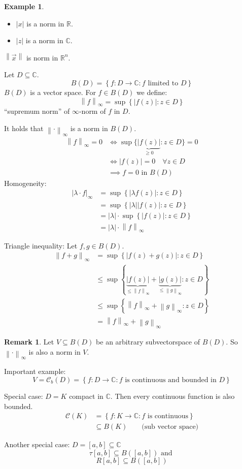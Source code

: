 \documentclass[a4paper,landscape,twocolumn]{article}
\theoremstyle{definition}
\newtheorem{rem}{Remark}
\newtheorem{ex}{Example}
\newcommand\set[1]{\left\{#1\right\}}
\newcommand\abs[1]{\left|#1\right|}
\newcommand\norm[1]{\left\|#1\right\|}
\newcommand\inorm[1]{\left\|#1\right\|_\infty}
\begin{document}
\begin{ex}
  \begin{itemize}
    \item $\abs{x}$ is a norm in $\mathbb R$.
    \item $\abs{z}$ is a norm in $\mathbb C$.
  \end{itemize}
  $\norm{\vec{x}}$ is norm in $\mathbb R^n$.

  Let $D \subseteq \mathbb C$.
  \[ B(D) = \set{f: D \to \mathbb C: f \text{ limited to } D} \]
  $B(D)$ is a vector space. For $f \in B(D)$ we define:
  \[ \norm{f}_{\infty} = \sup\set{\abs{f(z)}: z \in D} \]
  \enquote{supremum norm} of $\infty$-norm of $f$ in $D$.

  It holds that $\norm{\cdot}_{\infty}$ is a norm in $B(D)$.
  \begin{align*}
    \norm{f}_\infty = 0
    &\iff \sup\{\underbrace{\abs{f(z)}}_{\geq 0}: z \in D\} = 0 \\
    &\iff \abs{f(z)} = 0 \quad \forall z \in D \\
    &\implies f = 0 \text{ in } B(D)
  \end{align*}
  Homogeneity:
  \begin{align*}
    \abs{\lambda \cdot f}_\infty
      &= \sup\set{\abs{\lambda f(z)}: z \in D} \\
      &= \sup\set{\abs{\lambda} \abs{f(z)}: z \in D} \\
      &= \abs{\lambda} \cdot \sup\set{\abs{f(z)}: z \in D} \\
      &= \abs{\lambda} \cdot \norm{f}_\infty
  \end{align*}

  Triangle inequality:
  Let $f,g \in B(D)$.
  \begin{align*}
    \norm{f+g}_\infty
      &= \sup\set{\abs{f(z) + g(z)}: z \in D} \\
      &\leq \sup\set{\underbrace{\abs{f(z)}}_{\leq \norm{f}_\infty} + \underbrace{\abs{g(z)}}_{\leq \norm{g}_\infty}: z \in D} \\
      &\leq \sup\set{\inorm{f} + \inorm{g}: z \in D} \\
      &= \inorm{f} + \inorm{g}
  \end{align*}
\end{ex}

\begin{rem}
  Let $V \subseteq B(D)$ be an arbitrary subvectorspace of $B(D)$.
  So $\norm{\cdot}_\infty$ is also a norm in $V$.

  Important example:
  \[ V = \mathcal C_b(D) = \set{f: D \to \mathbb C: f \text{ is continuous and bounded in } D} \]

  Special case: $D = K$ compact in $\mathbb C$.
  Then every continuous function is also bounded.
  \begin{align*}
    \mathcal C(K) &= \set{f: K \to \mathbb C: f \text{ is continuous}} \\
      &\subseteq B(K) \qquad \text{(sub vector space)}
  \end{align*}

  Another special case: $D = [a,b] \subseteq \mathbb C$
  \[ \tau[a,b] \subseteq B([a,b]) \text{ and } \]
  \[ R[a,b] \subseteq B([a,b]) \]
\end{rem}
\end{document}
